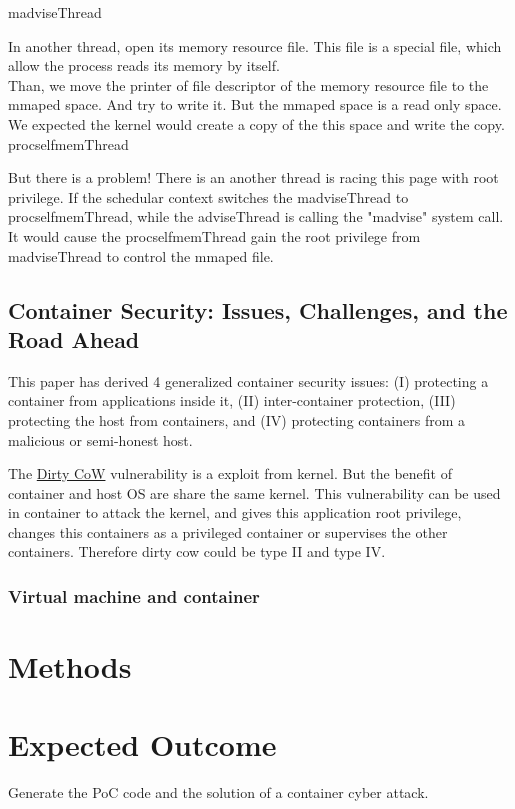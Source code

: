 \documentclass[12pt,a4paper,oneside,draft]{IEEEconf}
\begin{document}
\hypertarget{madvise}{madviseThread}


In another thread, open its memory resource file. This file is a special file, which allow
the process reads its memory by itself.\\
Than, we move the printer of file descriptor of the memory resource file to the mmaped
space. And try to write it. But the mmaped space is a read only space. We expected the
kernel would create a copy of the this space and write the copy\cite{root_exploit}.
\hypertarget{procself}{procselfmemThread}


But there is a problem! There is an another thread is racing this page with root privilege.
If the schedular context switches the madviseThread to procselfmemThread, while the
adviseThread is calling the "madvise" system call. It would cause the procselfmemThread
gain the root privilege from madviseThread to control the mmaped file.

\subsection{Container Security: Issues, Challenges, and the Road Ahead\cite{Road_Ahead}}
This paper has derived 4 generalized container security issues: (\RN{1}) protecting a
container from applications inside it, (\RN{2}) inter-container protection, (\RN{3})
protecting the host from containers, and (\RN{4}) protecting containers from a malicious
or semi-honest host.\cite{Road_Ahead}

The \hyperlink{dirty cow}{Dirty CoW} vulnerability is a exploit from kernel. But the benefit
of container and host OS are share the same kernel. This vulnerability can be used in
container to attack the kernel, and gives this application root privilege, changes this
containers as a privileged container or supervises the other containers. Therefore dirty
cow could be type \RN{2} and type \RN{4}.

\subsubsection{Virtual machine and container}



\section{Methods}

\section{Expected Outcome}
Generate the PoC code and the solution of a container cyber attack.

\printbibheading[heading=bibnumbered]
\printbibliography\newrefcontext
\end{document}
